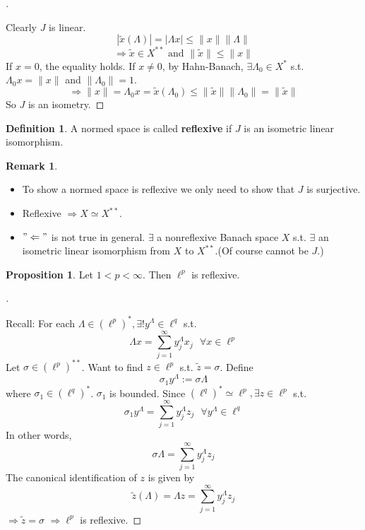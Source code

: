 \documentclass{article}
\theoremstyle{definition}
\newtheorem{dfn}{Definition}
\newtheorem{rem}{Remark}
\newtheorem{prop}{Proposition}
\newenvironment{proofs}[1][\proofname]{%
  \begin{proof}[#1]$ $\par\nobreak\ignorespaces
}{%
  \end{proof}
}
\newcommand{\sfa}{\text{  } \forall}
\begin{document}
\begin{proofs}
	Clearly $J$ is linear.
	\[
		|\tilde{x}(\Lambda)| = |\Lambda x | \leq \|x\| \|\Lambda\|
	\]
	\[
		\Rightarrow \tilde{x} \in X^{**} \text{ and }\|\tilde{x}\| \leq \|x\|
	\]
	If $x = 0$, the equality holds.
	If $x \neq 0$, by Hahn-Banach, $\exists \Lambda_0 \in X^*$ s.t. $\Lambda_0 x = \|x\|$ and $\|\Lambda_0\| = 1$.
	\[
		\Rightarrow \|x\| = \Lambda_0 x = \tilde{x}(\Lambda_0) \leq \|\tilde{x}\|\|\Lambda_0\| = \|\tilde{x}\|
	\]
	So $J$ is an isometry.
\end{proofs}

\begin{dfn}
	A normed space is called \textbf{reflexive} if $J$ is an isometric linear isomorphism.
\end{dfn}

\begin{rem}
	\begin{itemize}
		\item To show a normed space is reflexive we only need to show that $J$ is surjective.

		\item Reflexive $\Rightarrow X \simeq X^{**}$.
			
		\item $"\Leftarrow"$ is  not true in general.
			$\exists$ a nonreflexive Banach space $X$ s.t. $\exists$ an isometric linear isomorphism from $X$ to $X^{**}$.(Of course cannot be $J$.)
	\end{itemize}
\end{rem}

\begin{prop}
	Let $1 < p < \infty$.
	Then $\ell^p$ is reflexive.
\end{prop}

\begin{proofs}
	Recall: For each $\Lambda \in (\ell^p)^*, \exists !y^{\Lambda} \in \ell^q$ s.t.
	\[
		\Lambda x = \sum_{j = 1}^\infty y_j^{\Lambda} x_j \sfa x \in \ell^p
	\]
	Let $\sigma \in (\ell^p)^{**}$.
	Want to find $z \in \ell^p$ s.t. $\tilde{z} = \sigma$.
	Define 
	\[
		\sigma_1 y^{\Lambda} := \sigma \Lambda
	\]
	where $\sigma_1 \in (\ell^q)^*$.
	$\sigma_1$ is bounded.
	Since $(\ell^q)^* \simeq \ell^p, \exists z \in \ell^p$ s.t.
	\[
		\sigma_1 y^{\Lambda} = \sum_{j =1}^\infty y_j^{\Lambda} z_j \sfa y^{\Lambda} \in \ell^q
	\]
	In other words,
	\[
		\sigma \Lambda = \sum_{j = 1}^\infty y_j^{\Lambda} z_j
	\]
	The canonical identification of $z$ is given by 
	\[
		\tilde{z}(\Lambda) = \Lambda z = \sum_{j = 1}^\infty y_j^{\Lambda} z_j
	\]
	$\Rightarrow \tilde{z} = \sigma$
	$\Rightarrow \ell^p$ is reflexive.
\end{proofs}
\end{document}
